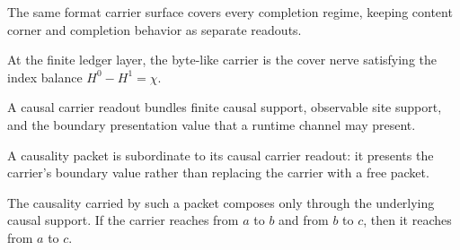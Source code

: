 \begin{theorem}\label{thm:format-regime-byte-surface}\leanok{}
The same format carrier surface covers every completion regime, keeping content
corner and completion behavior as separate readouts.
\end{theorem}

\begin{theorem}\label{thm:ledger-it-bit-byte}\leanok{}
At the finite ledger layer, the byte-like carrier is the cover nerve satisfying
the index balance \(H^0-H^1=\chi\).
\end{theorem}

\begin{definition}\label{def:causal-carrier-readout}\leanok{}
A causal carrier readout bundles finite causal support, observable site support,
and the boundary presentation value that a runtime channel may present.
\end{definition}

\begin{theorem}\label{thm:causality-packet-boundary-presentation}\leanok{}
A causality packet is subordinate to its causal carrier readout: it presents the
carrier's boundary value rather than replacing the carrier with a free packet.
\end{theorem}

\begin{theorem}\label{thm:causality-packet-reaches-trans}\leanok{}
The causality carried by such a packet composes only through the underlying
causal support.  If the carrier reaches from \(a\) to \(b\) and from \(b\) to
\(c\), then it reaches from \(a\) to \(c\).
\end{theorem}
